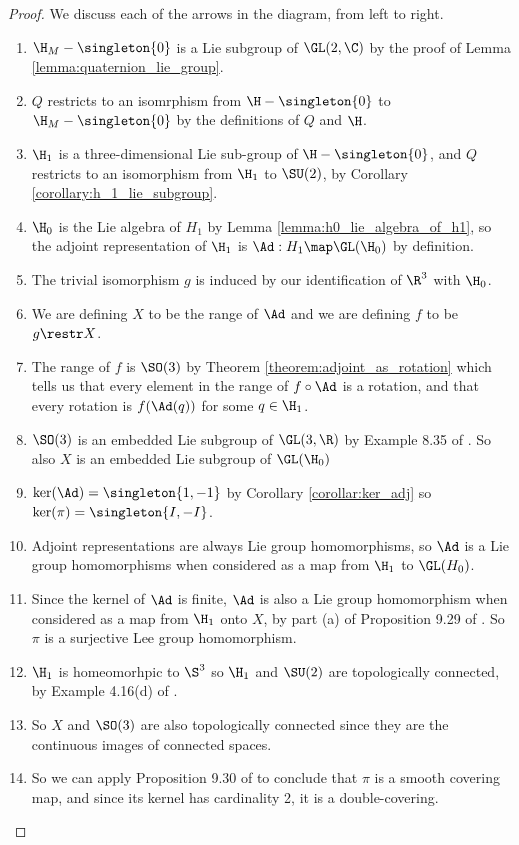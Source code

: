 \documentclass[oneside,12pt]{amsart}
\begin{document}
\begin{proof} We discuss each of the arrows in the diagram, from left to right. 
\begin{enumerate}
\item $\H_M - \singleton{0}$ is a Lie subgroup of $\GL(2,\C)$ by the proof of Lemma \ref{lemma:quaternion_lie_group}.
\item $Q$ restricts to an isomrphism from $\H - \singleton{0}$ to $\H_M - \singleton{0}$ by the definitions of $Q$ and $\H$.
\item  $\H_1$ is a three-dimensional Lie sub-group of $\H-\singleton{0}$, and $Q$ restricts to an isomorphism
from $\H_1$ to $\SU(2)$, by Corollary \ref{corollary:h_1_lie_subgroup}.
\item $\H_0$ is the Lie algebra of $H_1$ by Lemma \ref{lemma:h0_lie_algebra_of_h1}, so the adjoint representation of
$\H_1$ is $\Ad:H_1\map\GL(\H_0)$ by definition.
\item The trivial isomorphism $g$ is induced by our identification of $\R^3$ with $\H_0$.
\item We are defining $X$ to be the range of $\Ad$ and we are defining $f$ to be $g\restr X$.
\item The range of $f$ is $\SO(3)$ by Theorem \ref{theorem:adjoint_as_rotation}
which tells us that every element in the range of $f \circ \Ad$ is a rotation, and that every rotation is 
$f(\Ad(q))$ for some $q\in\H_1$.
\item $\SO(3)$ is an embedded Lie subgroup of $\GL(3,\R)$ by Example 8.35 of \cite{Lee_Smooth_Book}. So also $X$ is 
an embedded Lie subgroup of $\GL(\H_0)$
\item $\ker(\Ad) = \singleton{1,-1}$ by Corollary \ref{corollar:ker_adj} so $\ker(\pi) = \singleton{I, -I}$.
\item Adjoint representations are always Lie group homomorphisms, so $\Ad$ is a Lie group homomorphisms when considered
as a map from $\H_1$ to $\GL(H_0)$.
\item Since the kernel of $\Ad$ is finite, $\Ad$ is also a Lie group homomorphism when considered as a map from $\H_1$ onto $X$,
by part (a) of Proposition 9.29 of \cite{Lee_Smooth_Book}. So $\pi$ is a surjective Lee group homomorphism.
\item $\H_1$ is homeomorhpic to $\S^3$ so $\H_1$ and $\SU(2)$ are topologically connected, by Example 4.16(d) of \cite{Lee_Topology_Book}.
\item So $X$ and $\SO(3)$ are also topologically connected since they are the continuous images of connected spaces.
\item So we can apply Proposition 9.30 of \cite{Lee_Smooth_Book} to conclude that $\pi$ is a smooth covering map, and since its kernel
has cardinality 2, it is a double-covering.
\end{enumerate}
\end{proof}
\end{document}
